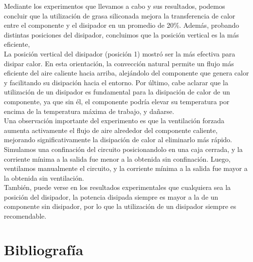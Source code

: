 \documentclass[conference]{IEEEtran}
\begin{document}
    Mediante los experimentos que llevamos a cabo y sus resultados, podemos concluir que la utilización de grasa 
    siliconada mejora la transferencia de calor entre el componente y el disipador en un promedio de 20\%. Además,
    probando distintas posiciones del disipador, concluimos que la posición vertical es la más eficiente,
    \\La posición vertical del disipador (posición 1) mostró ser la más efectiva para disipar calor. En esta orientación, 
    la convección natural permite un flujo más eficiente del aire caliente hacia arriba, alejándolo del componente que 
    genera calor y facilitando su disipación hacia el entorno. Por último, cabe aclarar que la utilización de un
    disipador es fundamental para la disipación de calor de un componente, ya que sin él, el componente podría elevar
    su temperatura por encima de la temperatura máxima de trabajo, y dañarse. \\Una observación importante del experimento
    es que la ventilación forzada aumenta activamente el flujo de aire alrededor del componente caliente, mejorando 
    significativamente la disipación de calor al eliminarlo más rápido. Simulamos una confinación del circuito posicionandolo
    en una caja cerrada, y la corriente mínima a la salida fue menor a la obtenida sin confinación. Luego, ventilamos
    manualmente el circuito, y la corriente mínima a la salida fue mayor a la obtenida sin ventilación.
    \\También, puede verse en los resultados
    experimentales que cualquiera sea la posición del disipador, la potencia disipada siempre es mayor a la de un
    componente sin disipador, por lo que la utilización de un disipador siempre es recomendable.

    \section{Bibliografía}
\end{document}
